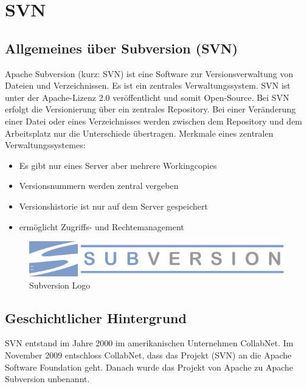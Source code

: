 \section{SVN}
\subsection{Allgemeines  \"uber Subversion (SVN)}
Apache Subversion (kurz: SVN) ist eine Software zur Versionsverwaltung von Dateien und Verzeichnissen. Es ist ein zentrales Verwaltungssystem. SVN ist unter der Apache-Lizenz 2.0 ver\"offentlicht und somit Open-Source. Bei SVN erfolgt die Versionierung \"uber ein zentrales Repository. Bei einer Ver\"anderung einer Datei oder eines Verzeichnisses werden zwischen dem Repository und dem Arbeitsplatz nur die Unterschiede \"ubertragen. Merkmale eines zentralen Verwaltungssystemes:
\begin{itemize}
    \item Es gibt nur eines Server aber mehrere Workingcopies
    \item Versionsnummern werden zentral vergeben
    \item Versionshistorie ist nur auf dem Server gespeichert
    \item erm\"oglicht Zugriffs- und Rechtemanagement
\end{itemize}

\begin{figure}[h!]
\centering
\includegraphics[width=\textwidth]{subversion_logo.png}
\caption{Subversion Logo}
\label{fig:logo}
\end{figure}

\subsection{Geschichtlicher Hintergrund}
SVN entstand im Jahre 2000 im amerikanischen Unternehmen CollabNet.
Im November 2009 entschloss CollabNet, dass das Projekt (SVN) an die Apache Software Foundation geht. Danach wurde das Projekt von Apache zu Apache Subversion unbenannt.

